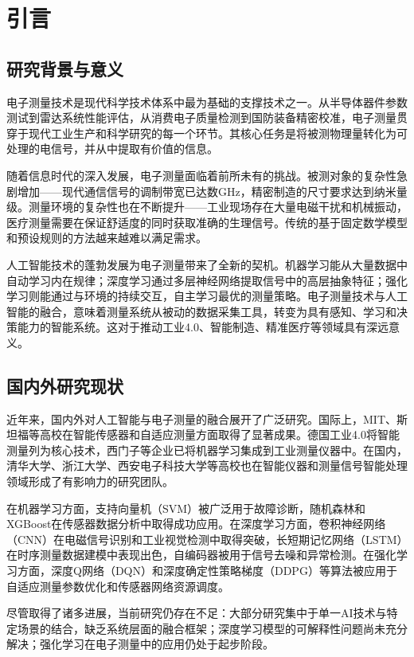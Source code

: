 \documentclass[12pt,a4paper]{article}
\numberwithin{figure}{section}
\numberwithin{table}{section}
\numberwithin{equation}{section}
\begin{document}
\section{引言}

\subsection{研究背景与意义}

电子测量技术是现代科学技术体系中最为基础的支撑技术之一。从半导体器件参数测试到雷达系统性能评估，从消费电子质量检测到国防装备精密校准，电子测量贯穿于现代工业生产和科学研究的每一个环节。其核心任务是将被测物理量转化为可处理的电信号，并从中提取有价值的信息。

随着信息时代的深入发展，电子测量面临着前所未有的挑战。被测对象的复杂性急剧增加——现代通信信号的调制带宽已达数GHz，精密制造的尺寸要求达到纳米量级。测量环境的复杂性也在不断提升——工业现场存在大量电磁干扰和机械振动，医疗测量需要在保证舒适度的同时获取准确的生理信号。传统的基于固定数学模型和预设规则的方法越来越难以满足需求。

人工智能技术的蓬勃发展为电子测量带来了全新的契机。机器学习能从大量数据中自动学习内在规律；深度学习通过多层神经网络提取信号中的高层抽象特征；强化学习则能通过与环境的持续交互，自主学习最优的测量策略。电子测量技术与人工智能的融合，意味着测量系统从被动的数据采集工具，转变为具有感知、学习和决策能力的智能系统。这对于推动工业4.0、智能制造、精准医疗等领域具有深远意义。

\subsection{国内外研究现状}

近年来，国内外对人工智能与电子测量的融合展开了广泛研究。国际上，MIT、斯坦福等高校在智能传感器和自适应测量方面取得了显著成果。德国工业4.0将智能测量列为核心技术，西门子等企业已将机器学习集成到工业测量仪器中。在国内，清华大学、浙江大学、西安电子科技大学等高校也在智能仪器和测量信号智能处理领域形成了有影响力的研究团队。

在机器学习方面，支持向量机（SVM）被广泛用于故障诊断，随机森林和XGBoost在传感器数据分析中取得成功应用。在深度学习方面，卷积神经网络（CNN）在电磁信号识别和工业视觉检测中取得突破，长短期记忆网络（LSTM）在时序测量数据建模中表现出色，自编码器被用于信号去噪和异常检测。在强化学习方面，深度Q网络（DQN）和深度确定性策略梯度（DDPG）等算法被应用于自适应测量参数优化和传感器网络资源调度。

尽管取得了诸多进展，当前研究仍存在不足：大部分研究集中于单一AI技术与特定场景的结合，缺乏系统层面的融合框架；深度学习模型的可解释性问题尚未充分解决；强化学习在电子测量中的应用仍处于起步阶段。
\end{document}
